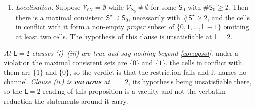 \begin{proposition}
\begin{enumerate}
\item[(iv)] \emph{Localisation.} Suppose $\mathcal V_{CI}=\emptyset$ while
$\mathcal V_{\mathsf S_0}\neq\emptyset$ for some $\mathsf S_0$ with $\#\mathsf S_0\ge2$. Then there is a
maximal consistent $\mathsf S^{\star}\supseteq\mathsf S_0$, necessarily with
$\#\mathsf S^{\star}\ge2$, and the cells in conflict with it form a non-empty \emph{proper} subset of
$\{0,1,\dots,\mathsf L-1\}$ omitting at least two cells. The hypothesis of this clause is
unsatisfiable at $\mathsf L=2$.
\end{enumerate}
\emph{At $\mathsf L=2$ clauses \textup{(i)}--\textup{(iii)} are true and say nothing beyond
\cref{cor:opsol}}: under a violation the maximal consistent sets are $\{0\}$ and $\{1\}$, the cells in
conflict with them are $\{1\}$ and $\{0\}$, so the verdict is that the restriction fails and it names no
channel. \emph{Clause \textup{(iv)} is \textbf{vacuous} at $\mathsf L=2$}, its hypothesis being
unsatisfiable there, so the $\mathsf L=2$ reading of this proposition is a vacuity and not the verbatim
reduction the statements around it carry.
\end{proposition}

